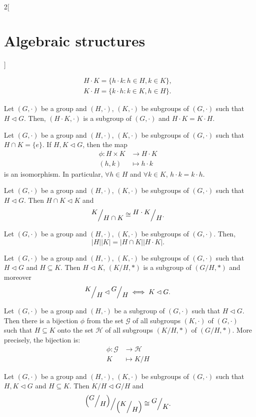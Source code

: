 \documentclass[class=article,10pt,crop=false]{standalone}
\begin{document}
\begin{multicols}{2}[\section{Algebraic structures}]
\begin{definition}
\begin{gather*}
    H\cdot K=\{h\cdot k:h\in H,k\in K\},\\
    K\cdot H=\{k\cdot h:k\in K,h\in H\}.
\end{gather*}
\end{definition}
\begin{prop}
Let $(G,\cdot)$ be a group and $(H,\cdot)$, $(K,\cdot)$ be subgroups of $(G,\cdot)$ such that $H\lhd G$. Then, $(H\cdot K,\cdot)$ is a subgroup of $(G,\cdot)$ and $H\cdot K=K\cdot H$.
\end{prop}
\begin{prop}
Let $(G,\cdot)$ be a group and $(H,\cdot)$, $(K,\cdot)$ be subgroups of $(G,\cdot)$ such that $H\cap K=\{e\}$. If $H,K\lhd G$, then the map 
\begin{align*}
    \phi:H\times K&\longrightarrow H\cdot K\\
    (h,k)&\longmapsto h\cdot k
\end{align*}
is an isomorphism. In particular, $\forall h\in H$ and $\forall k\in K$, $h\cdot k=k\cdot h$.
\end{prop}
\begin{theorem}
Let $(G,\cdot)$ be a group and $(H,\cdot)$, $(K,\cdot)$ be subgroups of $(G,\cdot)$ such that $H\lhd G$. Then $H\cap K\lhd K$ and $$\quot{K}{H\cap K}\cong\quot{H\cdot K}{H}.$$
\end{theorem}
\begin{corollary}
Let $(G,\cdot)$ be a group and $(H,\cdot)$, $(K,\cdot)$ be subgroups of $(G,\cdot)$. Then, $$|H||K|=|H\cap K||H\cdot K|.$$
\end{corollary}
\begin{lemma}
Let $(G,\cdot)$ be a group and $(H,\cdot)$, $(K,\cdot)$ be subgroups of $(G,\cdot)$ such that $H\lhd G$ and $H\subseteq K$. Then $H\lhd K$, $(K/H,*)$ is a subgroup of $(G/H,*)$ and moreover $$\quot{K}{H}\lhd\quot{G}{H}\iff K\lhd G.$$
\end{lemma}
\begin{theorem}
Let $(G,\cdot)$ be a group and $(H,\cdot)$ be a subgroup of $(G,\cdot)$ such that $H\lhd G$. Then there is a bijection $\phi$ from the set $\mathcal{G}$ of all subgroups $(K,\cdot)$ of $(G,\cdot)$ such that $H\subseteq K$ onto the set $\mathcal{H}$ of all subgroups $\left(K/H,*\right)$ of $\left(G/H,*\right)$. More precisely, the bijection is:
\begin{align*}
    \phi:\mathcal{G}&\longrightarrow\mathcal{H}\\
    K&\longmapsto K/H
\end{align*}
\end{theorem}
\begin{theorem}
Let $(G,\cdot)$ be a group and $(H,\cdot)$, $(K,\cdot)$ be subgroups of $(G,\cdot)$ such that $H,K\lhd G$ and $H\subseteq K$. Then $K/H\lhd G/H$ and $$\quot{\left(\quot{G}{H}\right)}{\left(\quot{K}{H}\right)}\cong\quot{G}{K}.$$
\end{theorem}

\end{multicols}
\end{document}
